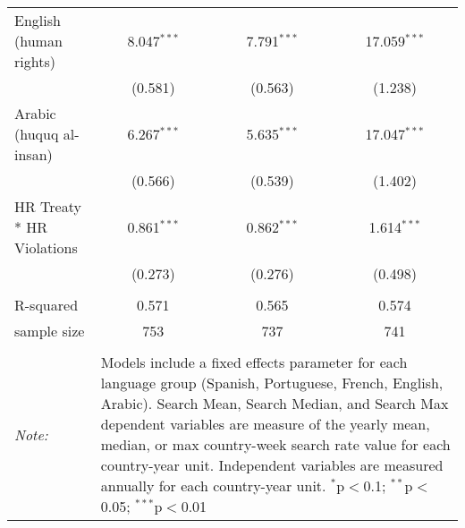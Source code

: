 \begin{table}[!htbp]
\begin{tabular}{@{\extracolsep{5pt}}lccc}
  English (human rights) & 8.047$^{***}$ & 7.791$^{***}$ & 17.059$^{***}$ \\ 
  & (0.581) & (0.563) & (1.238) \\ 
  Arabic (huquq al-insan) & 6.267$^{***}$ & 5.635$^{***}$ & 17.047$^{***}$ \\ 
  & (0.566) & (0.539) & (1.402) \\ 
  HR Treaty * HR Violations & 0.861$^{***}$ & 0.862$^{***}$ & 1.614$^{***}$ \\ 
  & (0.273) & (0.276) & (0.498) \\ 
 \hline \\[-1.8ex] 
R-squared  & 0.571 & 0.565 & 0.574 \\ 
sample size  & 753 & 737 & 741 \\ 
\hline 
\hline \\[-1.8ex] 
\textit{Note:}  & \multicolumn{3}{l}{\parbox[t]{8cm}{Models include a fixed effects parameter for each language group (Spanish, Portuguese, French, English, Arabic). Search Mean, Search Median, and Search Max dependent variables are measure of the yearly mean, median, or max country-week search rate value for each country-year unit. Independent variables are measured annually for each country-year unit. $^{*}$p$<$0.1; $^{**}$p$<$0.05; $^{***}$p$<$0.01}} \\ 
\end{tabular} 
\end{table} 
